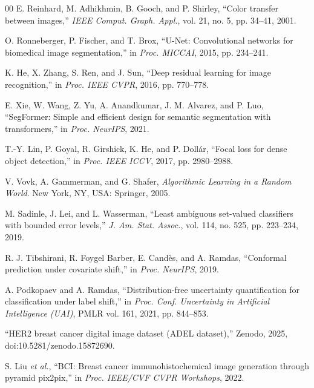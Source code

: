 \documentclass[conference]{IEEEtran}
\begin{document}
\begin{thebibliography}{00}
 E. Reinhard, M. Adhikhmin, B. Gooch, and P. Shirley,
``Color transfer between images,'' \emph{IEEE Comput. Graph. Appl.},
vol. 21, no. 5, pp. 34--41, 2001.

 O. Ronneberger, P. Fischer, and T. Brox, ``U-Net:
Convolutional networks for biomedical image segmentation,'' in \emph{Proc.
MICCAI}, 2015, pp. 234--241.

 K. He, X. Zhang, S. Ren, and J. Sun, ``Deep residual
learning for image recognition,'' in \emph{Proc. IEEE CVPR}, 2016,
pp. 770--778.

 E. Xie, W. Wang, Z. Yu, A. Anandkumar, J. M. Alvarez, and
P. Luo, ``SegFormer: Simple and efficient design for semantic segmentation
with transformers,'' in \emph{Proc. NeurIPS}, 2021.

 T.-Y. Lin, P. Goyal, R. Girshick, K. He, and P. Doll\'ar,
``Focal loss for dense object detection,'' in \emph{Proc. IEEE ICCV}, 2017,
pp. 2980--2988.

 V. Vovk, A. Gammerman, and G. Shafer, \emph{Algorithmic
Learning in a Random World}. New York, NY, USA: Springer, 2005.

 M. Sadinle, J. Lei, and L. Wasserman, ``Least
ambiguous set-valued classifiers with bounded error levels,'' \emph{J. Am.
Stat. Assoc.}, vol. 114, no. 525, pp. 223--234, 2019.

 R. J. Tibshirani, R. Foygel Barber, E. Cand\`es,
and A. Ramdas, ``Conformal prediction under covariate shift,'' in
\emph{Proc. NeurIPS}, 2019.

 A. Podkopaev and A. Ramdas, ``Distribution-free uncertainty quantification for classification under label shift,'' in \emph{Proc. Conf. Uncertainty in Artificial Intelligence (UAI)}, PMLR vol. 161, 2021, pp. 844--853.

 ``HER2 breast cancer digital image dataset (ADEL dataset),'' Zenodo, 2025, doi:10.5281/zenodo.15872690.

 S. Liu \emph{et al.}, ``BCI: Breast cancer immunohistochemical image generation through pyramid pix2pix,'' in \emph{Proc. IEEE/CVF CVPR Workshops}, 2022.

\end{thebibliography}
\end{document}
